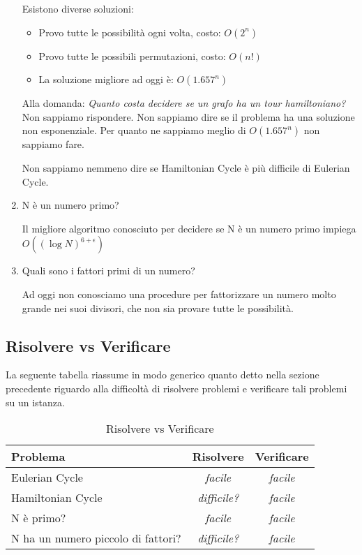 \documentclass[a4paper]{article}
\theoremstyle{definition}
\begin{document}
\begin{enumerate}
			Esistono diverse soluzioni:
			\begin{itemize}
				\item Provo tutte le possibilità ogni volta, costo: $ O(2^n) $
				\item Provo tutte le possibili permutazioni, costo: $ O(n!) $
				\item La soluzione migliore ad oggi è: $ O(1.657^n) $
			\end{itemize}
			Alla domanda: \textit{Quanto costa decidere se un grafo ha un tour hamiltoniano?} Non sappiamo rispondere. Non sappiamo dire se il problema ha una soluzione non esponenziale. Per quanto ne sappiamo meglio di $ O(1.657^n) $ non sappiamo fare.
			
			Non sappiamo nemmeno dire se Hamiltonian Cycle è più difficile di Eulerian Cycle.
			\item N è un numero primo?
			
			Il migliore algoritmo conosciuto per decidere se N è un numero primo impiega $ O((\log N)^{6 + \epsilon}) $
			\item Quali sono i fattori primi di un numero?
			
			Ad oggi non conosciamo una procedure per fattorizzare un numero molto grande nei suoi divisori, che non sia provare tutte le possibilità.
		\end{enumerate}
		
		\subsection{Risolvere vs Verificare}
			La seguente tabella riassume in modo generico quanto detto nella sezione precedente riguardo alla difficoltà di risolvere problemi e verificare tali problemi su un istanza.
			
			\begin{table}[h]
				\centering
				\caption{Risolvere vs Verificare}
				\label{tab:intro}
				\begin{tabular}{lcc}
					\toprule
					\textbf{Problema} & \textbf{Risolvere} & \textbf{Verificare} \\
					\midrule
					Eulerian Cycle & \textit{facile} & \textit{facile} \\
					Hamiltonian Cycle & \textit{difficile?} & \textit{facile} \\
					N è primo? & \textit{facile} & \textit{facile} \\
					N ha un numero piccolo di fattori? & \textit{difficile?} & \textit{facile} \\
					\bottomrule
				\end{tabular}
			\end{table}
		
\end{document}
